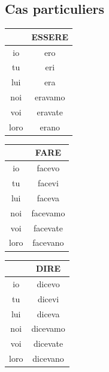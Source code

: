 \documentclass[12pt, openany]{report}
\begin{document}
\subsection{Cas particuliers}
\begin{minipage}{.315\textwidth}
    \begin{center}
        \begin{tabular}{c||c}
            & ESSERE \\ \hline
            io & ero \\
            tu & eri \\
            lui & era \\
            noi & eravamo \\
            voi & eravate \\
            loro & erano \\
        \end{tabular}
    \end{center}
\end{minipage}
\begin{minipage}{.315\textwidth}
    \begin{center}
        \begin{tabular}{c||c}
            & FARE \\ \hline
            io & facevo \\
            tu & facevi \\
            lui & faceva \\
            noi & facevamo\\
            voi & facevate\\
            loro & facevano \\
        \end{tabular}
    \end{center}
\end{minipage}
\begin{minipage}{.315\textwidth}
    \begin{center}
        \begin{tabular}{c||c}
            & DIRE \\ \hline
            io & dicevo \\
            tu & dicevi \\
            lui & diceva \\
            noi & dicevamo\\
            voi & dicevate \\
            loro & dicevano\\
        \end{tabular}
    \end{center}
\end{minipage}
\end{document}
